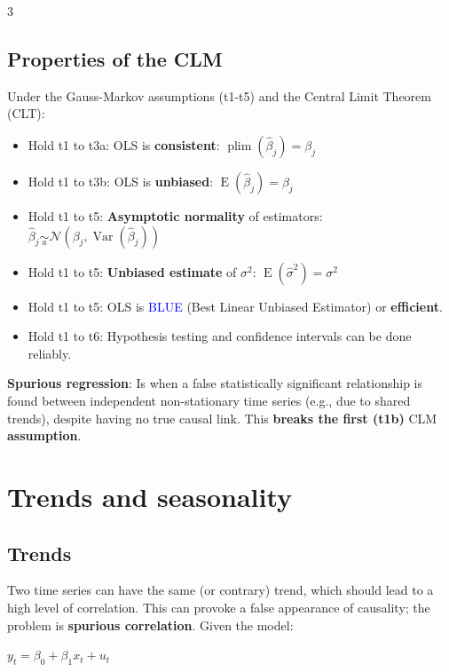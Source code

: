 \documentclass[10pt, a4paper, landscape]{article}
\DeclareMathOperator{\E}{E}
\DeclareMathOperator{\Var}{Var}
\begin{document}
\begin{multicols}{3}
\subsection*{Properties of the CLM}

Under the Gauss-Markov assumptions (t1-t5) and the Central Limit Theorem (CLT):

\begin{itemize}[leftmargin=*]
	\item Hold t1 to t3a: OLS is \textbf{consistent}: \( \operatorname{plim}(\hat{\beta}_{j}) = \beta_{j} \)
	\item Hold t1 to t3b: OLS is \textbf{unbiased}: \( \E(\hat{\beta}_{j}) = \beta_{j} \)
	\item Hold t1 to t5: \textbf{Asymptotic normality} of estimators: \( \hat{\beta}_{j} \underset{a}{\sim} \mathcal{N} (\beta_{j}, \Var(\hat{\beta}_{j})) \)
	\item Hold t1 to t5: \textbf{Unbiased estimate} of \( \sigma^{2} \): \( \E(\hat{\sigma}^{2}) = \sigma^{2} \)
	\item Hold t1 to t5: OLS is \textcolor{blue}{BLUE} (Best Linear Unbiased Estimator) or \textbf{efficient}.
	\item Hold t1 to t6: Hypothesis testing and confidence intervals can be done reliably.
\end{itemize}

\columnbreak

\textbf{Spurious regression}: Is when a false statistically significant relationship is found between independent non-stationary time series (e.g., due to shared trends), despite having no true causal link. This \textbf{breaks the first (t1b)} CLM \textbf{assumption}.

\section*{Trends and seasonality}

\subsection*{Trends}

Two time series can have the same (or contrary) trend, which should lead to a high level of correlation. This can provoke a false appearance of causality; the problem is \textbf{spurious correlation}. Given the model:

\begin{center}
	\( y_{t} = \beta_{0} + \beta_{1} x_{t} + u_{t} \)
\end{center}


\end{multicols}
\end{document}
